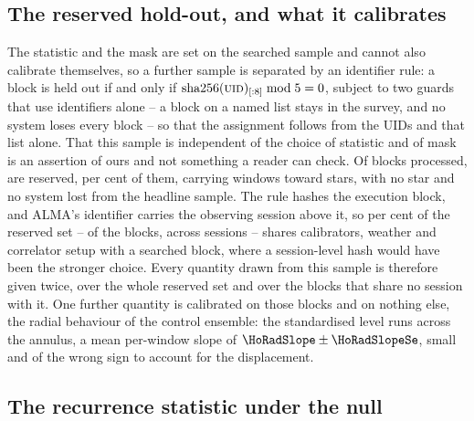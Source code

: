 \subsection{The reserved hold-out, and what it calibrates}
\label{sec:heldout}

The statistic and the mask are set on the searched sample and cannot also
calibrate themselves, so a further sample is separated by an identifier rule:
a block is held out if and only if
$\mathrm{sha256}(\textsc{uid})_{[:8]} \bmod 5 = 0$, subject to two guards that
use identifiers alone -- a block on a named list stays in the
survey, and no system loses every block -- so that the assignment follows
from the UIDs and that list alone. That this sample is independent of the
choice of statistic and of mask is an assertion of ours and not something a
reader can check. Of
\NEbProcessedAll{} blocks processed, \NEbHeldOut{} are reserved, \HoPctHeld{}
per cent of them, carrying \HoWin{} windows toward \HoStars{} stars, with
no star and no system lost from the headline sample. The rule hashes the
execution block, and ALMA's identifier carries the observing session above
it, so \HsSharePct{} per cent of the reserved set -- \BkSessHoBlocks{} of
the \NEbHeldOut{} blocks, across \BkSessShared{} sessions -- shares
calibrators, weather and correlator setup with a searched block, where a
session-level hash would have been the stronger choice. Every quantity drawn
from this sample is therefore given twice, over the whole reserved set and
over the \HsIndBlocks{} blocks that share no session with it.
One further quantity is calibrated on those blocks and on nothing else, the
radial behaviour of the control ensemble: the standardised level
runs \HoRadBins{} across the annulus, a mean per-window slope of
$\HoRadSlope\pm\HoRadSlopeSe$, small and of the wrong sign to account for the
displacement.

\subsection{The recurrence statistic under the null}
\label{sec:nullscatter}

